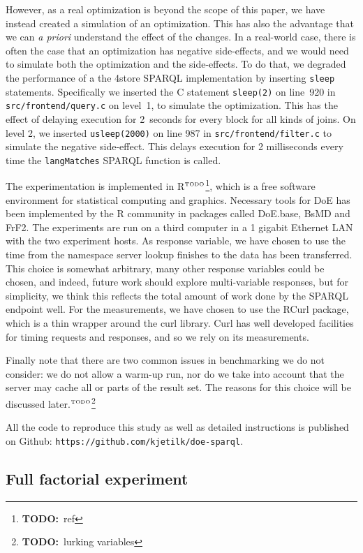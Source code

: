 \documentclass{article}
\newcommand{\todo}[1]{\ensuremath{^{\textrm{\tiny{TODO}\normalsize}}}\footnote{\textbf{TODO:}~#1}}
\begin{document}
However, as a real optimization is beyond the scope of this paper, we
have instead created a simulation of an optimization. This has also
the advantage that we can \textit{a priori} understand the effect of
the changes. In a real-world case, there is often the case that an
optimization has negative side-effects, and we would need to simulate
both the optimization and the side-effects. To do that, we degraded
the performance of a the 4store SPARQL implementation by inserting
\texttt{sleep} statements. Specifically we inserted the C statement
\texttt{sleep(2)} on line~920 in \texttt{src/frontend/query.c} on
level~1, to simulate the optimization. This has the effect of delaying
execution for 2~seconds for every block for all kinds of joins. On
level 2, we inserted \texttt{usleep(2000)} on line 987 in
\texttt{src/frontend/filter.c} to simulate the negative
side-effect. This delays execution for 2 milliseconds every time the
\texttt{langMatches} SPARQL function is called.

The experimentation is implemented in R\todo{ref}, which is a free
software environment for statistical computing and graphics. Necessary
tools for DoE has been implemented by the R community in packages
called DoE.base, BsMD and FrF2. The experiments are run on a third
computer in a 1 gigabit Ethernet LAN with the two experiment hosts.  As
response variable, we have chosen to use the time from the namespace
server lookup finishes to the data has been transferred. This choice is
somewhat arbitrary, many other response variables could be chosen, and
indeed, future work should explore multi-variable responses, but for
simplicity, we think this reflects the total amount of work done by
the SPARQL endpoint well. For the measurements, we have chosen to use
the RCurl package, which is a thin wrapper around the curl
library. Curl has well developed facilities for timing requests and
responses, and so we rely on its measurements.

Finally note that there are two common issues in benchmarking we do
not consider: we do not allow a warm-up run, nor do we take into
account that the server may cache all or parts of the result set. The
reasons for this choice will be discussed later.\todo{lurking
  variables}

All the code to reproduce this study as well as detailed instructions
is published on Github: \texttt{https://github.com/kjetilk/doe-sparql}.

\subsection{Full factorial experiment}
\end{document}
